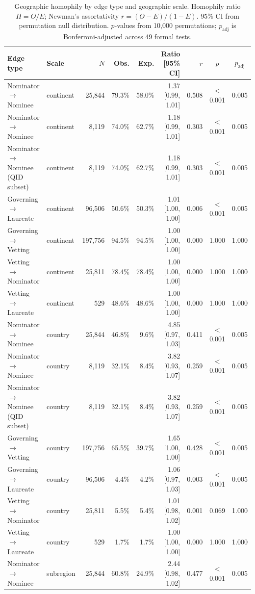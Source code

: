 \begin{table}[ht]
\centering
\caption{Geographic homophily by edge type and geographic scale. Homophily ratio $H = O/E$; Newman's assortativity $r = (O - E)/(1 - E)$. 95\% CI from permutation null distribution. $p$-values from 10{,}000 permutations; $p_{\text{adj}}$ is Bonferroni-adjusted across 49 formal tests.}
\label{tab:homophily_edge_type}
\small
\begin{tabular}{llrrrrrcc}
\toprule
Edge type & Scale & $N$ & Obs. & Exp. & Ratio [95\% CI] & $r$ & $p$ & $p_{\text{adj}}$ \\
\midrule
Nominator $\rightarrow$ Nominee & continent & 25,844 & 79.3\% & 58.0\% & 1.37 [0.99, 1.01] & 0.508 & $<$0.001 & 0.005 \\
Nominator $\rightarrow$ Nominee & continent & 8,119 & 74.0\% & 62.7\% & 1.18 [0.99, 1.01] & 0.303 & $<$0.001 & 0.005 \\
Nominator $\rightarrow$ Nominee (QID subset) & continent & 8,119 & 74.0\% & 62.7\% & 1.18 [0.99, 1.01] & 0.303 & $<$0.001 & 0.005 \\
Governing $\rightarrow$ Laureate & continent & 96,506 & 50.6\% & 50.3\% & 1.01 [1.00, 1.00] & 0.006 & $<$0.001 & 0.005 \\
Governing $\rightarrow$ Vetting & continent & 197,756 & 94.5\% & 94.5\% & 1.00 [1.00, 1.00] & 0.000 & 1.000 & 1.000 \\
Vetting $\rightarrow$ Nominator & continent & 25,811 & 78.4\% & 78.4\% & 1.00 [1.00, 1.00] & 0.000 & 1.000 & 1.000 \\
Vetting $\rightarrow$ Laureate & continent & 529 & 48.6\% & 48.6\% & 1.00 [1.00, 1.00] & 0.000 & 1.000 & 1.000 \\
Nominator $\rightarrow$ Nominee & country & 25,844 & 46.8\% & 9.6\% & 4.85 [0.97, 1.03] & 0.411 & $<$0.001 & 0.005 \\
Nominator $\rightarrow$ Nominee & country & 8,119 & 32.1\% & 8.4\% & 3.82 [0.93, 1.07] & 0.259 & $<$0.001 & 0.005 \\
Nominator $\rightarrow$ Nominee (QID subset) & country & 8,119 & 32.1\% & 8.4\% & 3.82 [0.93, 1.07] & 0.259 & $<$0.001 & 0.005 \\
Governing $\rightarrow$ Vetting & country & 197,756 & 65.5\% & 39.7\% & 1.65 [1.00, 1.00] & 0.428 & $<$0.001 & 0.005 \\
Governing $\rightarrow$ Laureate & country & 96,506 & 4.4\% & 4.2\% & 1.06 [0.97, 1.03] & 0.003 & $<$0.001 & 0.005 \\
Vetting $\rightarrow$ Nominator & country & 25,811 & 5.5\% & 5.4\% & 1.01 [0.98, 1.02] & 0.001 & 0.069 & 1.000 \\
Vetting $\rightarrow$ Laureate & country & 529 & 1.7\% & 1.7\% & 1.00 [1.00, 1.00] & 0.000 & 1.000 & 1.000 \\
Nominator $\rightarrow$ Nominee & subregion & 25,844 & 60.8\% & 24.9\% & 2.44 [0.98, 1.02] & 0.477 & $<$0.001 & 0.005 \\
\bottomrule
\end{tabular}
\end{table}
